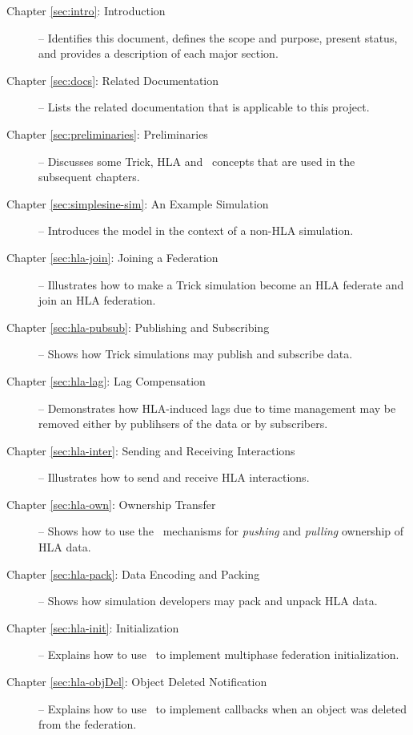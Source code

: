 \begin{description}

\item[Chapter \ref{sec:intro}: Introduction] --
Identifies this document, defines the scope and purpose, present status,
and provides a description of each major section.

\item[Chapter \ref{sec:docs}: Related Documentation] --
Lists the related documentation that is applicable to this project.

\item[Chapter \ref{sec:preliminaries}: Preliminaries] --
Discusses some Trick, HLA and \TrickHLA\ concepts that are used
in the subsequent chapters.

\item[Chapter \ref{sec:simplesine-sim}: An Example \simplesine Simulation] --
Introduces the \simplesine model in the context of a non-HLA simulation.

\item[Chapter \ref{sec:hla-join}: Joining a Federation] --
Illustrates how to make a Trick simulation become an HLA federate
and join an HLA federation.

\item[Chapter \ref{sec:hla-pubsub}: Publishing and Subscribing] --
Shows how Trick simulations may publish and subscribe data.

\item[Chapter \ref{sec:hla-lag}: Lag Compensation] --
Demonstrates how HLA-induced lags due to time management may be removed
either by publihsers of the data or by subscribers.

\item[Chapter \ref{sec:hla-inter}: Sending and Receiving Interactions] --
Illustrates how to send and receive HLA interactions.

\item[Chapter \ref{sec:hla-own}: Ownership Transfer] --
Shows how to use the \TrickHLA\ mechanisms for {\em pushing} and {\em pulling}
ownership of HLA data.

\item[Chapter \ref{sec:hla-pack}: Data Encoding and Packing] --
Shows how simulation developers may pack and unpack HLA data.

\item[Chapter \ref{sec:hla-init}: Initialization] --
Explains how to use \TrickHLA\ to implement multiphase
federation initialization.

\item[Chapter \ref{sec:hla-objDel}: Object Deleted Notification] --
Explains how to use \TrickHLA\ to implement callbacks when an object was deleted
from the federation.


\end{description}
